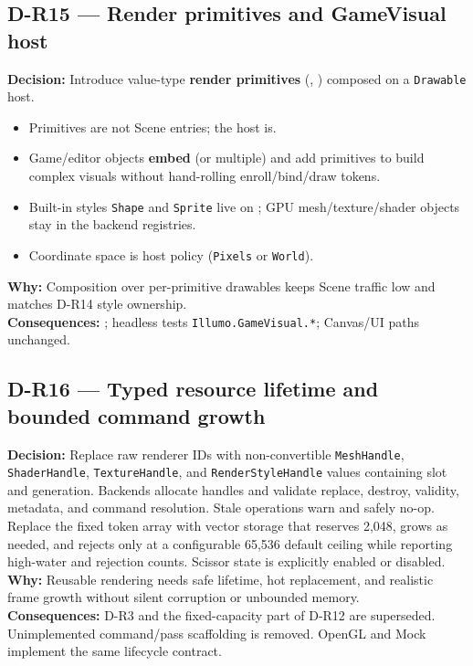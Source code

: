 \subsection*{D-R15 --- Render primitives and GameVisual host}
\begin{decisionbox}[title={D-R15 \quad 2026-08-07}]
\textbf{Decision:} Introduce value-type \textbf{render primitives}
(, ) composed on a
 \texttt{Drawable} host.
\begin{itemize}
  \item Primitives are not Scene entries; the host is.
  \item Game/editor objects \textbf{embed}  (or multiple)
        and add primitives to build complex visuals without hand-rolling
        enroll/bind/draw tokens.
  \item Built-in styles \texttt{Shape} and \texttt{Sprite} live on
        ; GPU mesh/texture/shader objects stay in the
        backend registries.
  \item Coordinate space is host policy (\texttt{Pixels} or \texttt{World}).
\end{itemize}
\textbf{Why:} Composition over per-primitive drawables keeps Scene traffic low
and matches D-R14 style ownership.\\
\textbf{Consequences:} ; headless tests
\texttt{Illumo.GameVisual.*}; Canvas/UI paths unchanged.
\end{decisionbox}

\subsection*{D-R16 --- Typed resource lifetime and bounded command growth}
\begin{decisionbox}[title={D-R16 \quad 2026-08-09}]
\textbf{Decision:} Replace raw renderer IDs with non-convertible
\texttt{MeshHandle}, \texttt{ShaderHandle}, \texttt{TextureHandle}, and
\texttt{RenderStyleHandle} values containing slot and generation. Backends
allocate handles and validate replace, destroy, validity, metadata, and command
resolution. Stale operations warn and safely no-op. Replace the fixed token
array with vector storage that reserves 2,048, grows as needed, and rejects only
at a configurable 65,536 default ceiling while reporting high-water and
rejection counts. Scissor state is explicitly enabled or disabled.\\
\textbf{Why:} Reusable rendering needs safe lifetime, hot replacement, and
realistic frame growth without silent corruption or unbounded memory.\\
\textbf{Consequences:} D-R3 and the fixed-capacity part of D-R12 are
superseded. Unimplemented command/pass scaffolding is removed. OpenGL and Mock
implement the same lifecycle contract.
\end{decisionbox}

